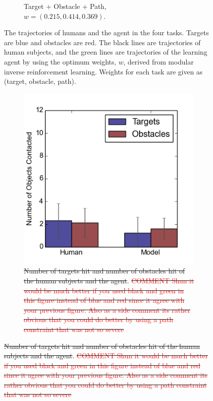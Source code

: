 \documentclass[11pt]{article} %
\providecommand{\DIFadd}[1]{{\protect\color{blue}\uwave{#1}}} %
\providecommand{\DIFdel}[1]{{\protect\color{red}\sout{#1}}}                      %
\providecommand{\DIFaddFL}[1]{\DIFadd{#1}} %
\providecommand{\DIFdelFL}[1]{\DIFdel{#1}} %
\providecommand{\DIFaddbeginFL}{} %
\providecommand{\DIFaddendFL}{} %
\providecommand{\DIFdelbeginFL}{} %
\providecommand{\DIFdelendFL}{} %
\begin{document}
\begin{figure}[h]
\begin{subfigure}[b]{0.24\textwidth}
\caption{Target + Obstacle + Path, \\$w = (0.215, 0.414, 0.369)$. }
\end{subfigure}
\caption{The trajectories of humans and the agent in the four tasks. Targets are blue and obstacles are red. The
black lines are trajectories of human subjects, and the green lines are
trajectories of the learning agent by using the optimum weights, $w$, derived
from modular inverse reinforcement learning. Weights for each task are given as (target,
obstacle, path).}

\label{fig:exp}
\end{figure}

\begin{figure}[h]
\centering
\DIFdelbeginFL %
\DIFdelendFL \DIFaddbeginFL \begin{subfigure}[b]{0.24\textwidth}
\includegraphics[width=\textwidth]{contact1.png}
\DIFaddendFL \caption{\DIFdelbeginFL \DIFdelFL{Number of targets hit and number of obstacles hit of the human subjects 
and the agent}\DIFdelendFL \DIFaddbeginFL \DIFaddFL{Path module only}\DIFaddendFL . \DIFdelbeginFL \DIFdelFL{\textcolor{red}{COMMENT Shun it would be much better if you used black and green in this figure instead of blue and red since it agree 
with your previous figure. Also as a side comment its rather obvious that you could do better by using a path constraint that was not so severe}}\DIFdelendFL }

\end{subfigure}
\end{figure}
\end{document}
